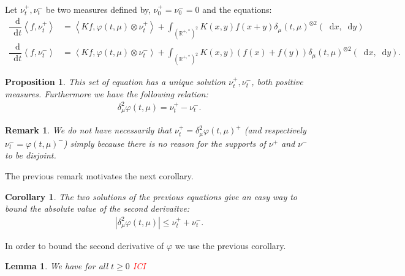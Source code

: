 \documentclass[11pt,a4paper]{article}
\newcommand{\RR}{\mathbb{R}}
\newcommand{\red}[1]{\textcolor{red}{#1}}
\newcommand{\dd}{\mathop{}\!\mathrm{d}}
\newtheorem{lemma}[theorem]{Lemma}
\newtheorem{remark}[theorem]{Remark}
\newtheorem{proposition}[theorem]{Proposition}
\newtheorem{corollary}[theorem]{Corollary}
\begin{document}
Let $\nu_t^+,\nu_t^-$ be two measures defined by, $\nu_0^+ = \nu_0^- = 0$ and the equations:
\begin{align*}
    \dfrac{\dd }{\dd t} \left\langle f,\nu_t^+\right\rangle &= \left\langle Kf,\varphi(t,\mu)\otimes\nu_t^+ \right\rangle + \int_{\left(\RR^{+,*}\right)^2} K(x,y)f(x+y)\delta_\mu(t,\mu)^{\otimes 2}(\dd x,\dd y) \\
    \dfrac{\dd }{\dd t} \left\langle f,\nu_t^-\right\rangle &= \left\langle Kf,\varphi(t,\mu)\otimes\nu_t^- \right\rangle + \int_{\left(\RR^{+,*}\right)^2} K(x,y)\left(f(x) + f(y) \right)\delta_\mu(t,\mu)^{\otimes 2}(\dd x,\dd y).
\end{align*}
\begin{proposition}
    This set of equation has a unique solution $\nu_t^+,\nu_t^-$, both positive measures. Furthermore we have the following relation:
    \begin{align*}
        \delta^2_\mu \varphi(t,\mu) = \nu_t^+ - \nu_t^- .
    \end{align*}
\end{proposition}
\begin{remark}
    We do not have necessarily that $\nu_t^+ = \delta^2_\mu \varphi(t,\mu)^+$ (and respectively $\nu_t^- = \varphi(t,\mu)^-$) simply because there is no reason for the supports of $\nu^+$ and $\nu^-$ to be disjoint. 
\end{remark}
The previous remark motivates the next corollary.
\begin{corollary}
    The two solutions of the previous equations give an easy way to bound the absolute value of the second derivaitve:
    \begin{align*}
        \left|\delta^2_\mu \varphi(t,\mu)  \right| \leq \nu_t^+ + \nu_t^-.
    \end{align*}
\end{corollary}
In order to bound the second derivative of $\varphi$ we use the previous corollary. 
\begin{lemma}
    We have for all $t\geq 0$ \red{ICI}
\end{lemma}
\end{document}
